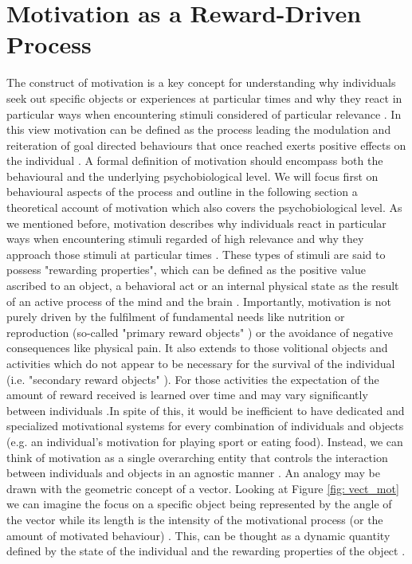 \section{Motivation as a Reward-Driven Process}
\label{motivation}
The construct of motivation is a key concept for understanding why individuals seek out specific objects or experiences at particular times and why they react in particular ways when encountering stimuli considered of particular relevance \cite{berridge2004motivation}. In this view motivation can be defined as the process leading the modulation and reiteration of goal directed behaviours that once reached exerts positive effects on the individual \cite{simpson2016behavioral}. A formal definition of motivation should encompass both the behavioural and the underlying psychobiological level. We will focus first on behavioural aspects of the process and outline in the following section a theoretical account of motivation which also covers the psychobiological level. As we mentioned before, motivation describes why individuals react in particular ways when encountering stimuli regarded of high relevance and why they approach those stimuli at particular times \cite{berridge2004motivation}. These types of stimuli are said to possess "rewarding properties", which can be defined as the positive value ascribed to an object, a behavioral act or an internal physical state as the result of an active process of the mind and the brain \cite{schultz1997neural,berridge2008affective}. Importantly, motivation is not purely driven by the fulfilment of fundamental needs like nutrition or reproduction (so-called "primary reward objects" \cite{schultz2000reward}) or the avoidance of negative consequences like physical pain. It also extends to those volitional objects and activities which do not appear to be necessary for the survival of the individual (i.e. "secondary reward objects" \cite{berridge2008affective,sescousse2013processing}). For those activities the expectation of the amount of reward received is learned over time and may vary significantly between individuals \cite{berridge2008affective,simpson2016behavioral}.In spite of this, it would be inefficient to have dedicated and specialized motivational systems for every combination of individuals and objects (e.g. an individual's motivation for playing sport or eating food). Instead, we can think of motivation as a single overarching entity that controls the interaction between individuals and objects in an agnostic manner \cite{simpson2016behavioral}. An analogy may be drawn with the geometric concept of a vector. Looking at Figure \ref{fig: vect_mot} we can imagine the focus on a specific object being represented by the angle of the vector while its length is the intensity of the motivational process (or the amount of motivated behaviour) \cite{simpson2016behavioral}. This, can be thought as a dynamic quantity defined by the state of the individual and the rewarding properties of the object \cite{toates1994comparing,berridge2004motivation,zhang2009neural}.
